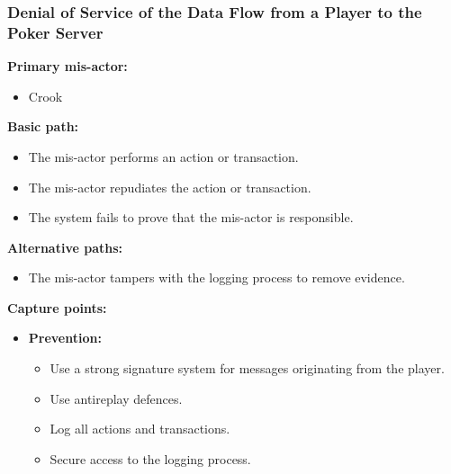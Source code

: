 \documentclass[a4paper,11pt]{report}
\begin{document}
\subsubsection{Denial of Service of the Data Flow from a Player to the Poker Server}
\textbf{Primary mis-actor:}
\begin{itemize}
\item Crook
\end{itemize}
\textbf{Basic path:}
\begin{itemize}
\item The mis-actor performs an action or transaction.
\item The mis-actor repudiates the action or transaction.
\item The system fails to prove that the mis-actor is responsible.
\end{itemize}
\textbf{Alternative paths:}
\begin{itemize}
\item The mis-actor tampers with the logging process to remove evidence.
\end{itemize}
\textbf{Capture points:}
\begin{itemize}
\item \textbf{Prevention:}
\begin{itemize}
\item Use a strong signature system for messages originating from the player.
\item Use antireplay defences.
\item Log all actions and transactions.
\item Secure access to the logging process.
\end{itemize}
\end{itemize}
\end{document}
